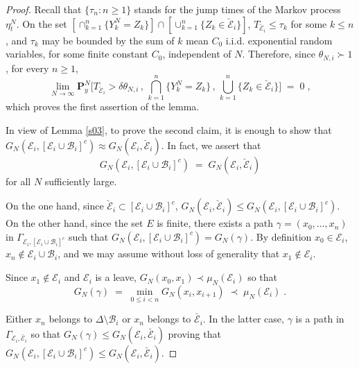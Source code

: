 \documentclass[reqno]{amsart}
\begin{document}
\begin{proof}
Recall that $\{\tau_n : n\ge 1\}$ stands for the jump times of the
Markov process $\eta^N_t$. On the set $[\cap_{k=1}^n \{Y^N_k =
Z_k\}] \cap [ \cup_{k=1}^n \{Z_k \in \breve{{{\mathcal E}}}_i\}]$,
$T_{\breve{{{\mathcal E}}}_i} \le \tau_k$ for some $k\le n$, and $\tau_k$ may
be bounded by the sum of $k$ mean $C_0$ i.i.d.\!  exponential random
variables, for some finite constant $C_0$, independent of $N$.
Therefore, since $\theta_{N,i}\succ 1$, for every $n\ge 1$,
\begin{equation*}
\lim_{N\to\infty}
{{\mathbf P}}_y^N \Big[ T_{\breve{{{\mathcal E}}}_i} > \delta \theta_{N,i} \,,\,
\bigcap_{k=1}^n \{Y^N_k = Z_k\} \,,\, \bigcup_{k=1}^n 
\{Z_k \in \breve{{{\mathcal E}}}_i\} \Big] \;=\; 0\; ,
\end{equation*}
which proves the first assertion of the lemma.

In view of Lemma \ref{s03}, to prove the second claim, it is enough to
show that $G_N({{\mathcal E}}_i , [{{\mathcal E}}_i \cup {{\mathcal B}}_i]^c) \approx G_N({{\mathcal E}}_i
, \breve{{{\mathcal E}}}_i)$. In fact, we assert that
\begin{equation}
\label{07}
G_N({{\mathcal E}}_i , [{{\mathcal E}}_i \cup {{\mathcal B}}_i]^c) \;=\;
 G_N({{\mathcal E}}_i , \breve{{{\mathcal E}}}_i)
\end{equation}
for all $N$ sufficiently large.

On the one hand, since $\breve{{{\mathcal E}}}_i \subset [{{\mathcal E}}_i \cup {{\mathcal B}}_i]^c$, $G_N({{\mathcal E}}_i , \breve{{{\mathcal E}}}_i) \le G_N({{\mathcal E}}_i , [{{\mathcal E}}_i
\cup {{\mathcal B}}_i]^c)$. On the other hand, since the set $E$ is finite,
there exists a path $\gamma = (x_0, \dots, x_n)$ in $\Gamma_{{{\mathcal E}}_i ,
  [{{\mathcal E}}_i \cup {{\mathcal B}}_i]^c}$ such that $G_N({{\mathcal E}}_i , [{{\mathcal E}}_i \cup
{{\mathcal B}}_i]^c) = G_N(\gamma)$. By definition $x_0\in {{\mathcal E}}_i$, $x_n
\not\in {{\mathcal E}}_i \cup {{\mathcal B}}_i$, and we may assume without loss of
generality that $x_1\not\in {{\mathcal E}}_i$.

Since $x_1\not\in {{\mathcal E}}_i$ and ${{\mathcal E}}_i$ is a leave, $G_N(x_0,x_1) \prec
\mu_N({{\mathcal E}}_i)$ so that 
\begin{equation}
\label{06}
G_N(\gamma) \;=\;
\min_{0\le i <n} G_N(x_i, x_{i+1}) \; \prec \; \mu_N({{\mathcal E}}_i)\;.
\end{equation}

Either $x_n$ belongs to $\Delta\setminus {{\mathcal B}}_i$ or $x_n$ belongs to
$\breve{{{\mathcal E}}_i}$. In the latter case, $\gamma$ is a path in
$\Gamma_{{{\mathcal E}}_i , \breve{{{\mathcal E}}_i}}$ so that $G_N(\gamma) \le G_N({{\mathcal E}}_i , \breve{{{\mathcal E}}_i})$ proving that $G_N({{\mathcal E}}_i , [{{\mathcal E}}_i \cup {{\mathcal B}}_i]^c) \le G_N({{\mathcal E}}_i , \breve{{{\mathcal E}}_i})$.


\end{proof}
\end{document}
